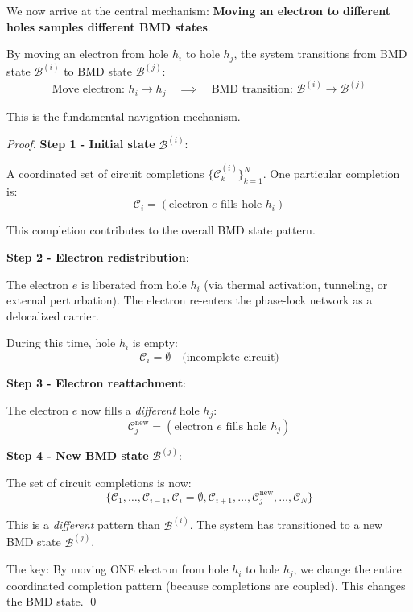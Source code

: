 We now arrive at the central mechanism: \textbf{Moving an electron to different holes samples different BMD states}.

\begin{theorem}
\label{thm:electron_navigation}
By moving an electron from hole $h_i$ to hole $h_j$, the system transitions from BMD state $\mathcal{B}^{(i)}$ to BMD state $\mathcal{B}^{(j)}$:
\begin{equation}
\text{Move electron: } h_i \to h_j \quad \implies \quad \text{BMD transition: } \mathcal{B}^{(i)} \to \mathcal{B}^{(j)}
\end{equation}

This is the fundamental navigation mechanism.
\end{theorem}

\begin{proof}
\textbf{Step 1 - Initial state} $\mathcal{B}^{(i)}$:

A coordinated set of circuit completions $\{\mathcal{C}_k^{(i)}\}_{k=1}^{N}$. One particular completion is:
\begin{equation}
\mathcal{C}_i = (\text{electron } e \text{ fills hole } h_i)
\end{equation}

This completion contributes to the overall BMD state pattern.

\textbf{Step 2 - Electron redistribution}:

The electron $e$ is liberated from hole $h_i$ (via thermal activation, tunneling, or external perturbation). The electron re-enters the phase-lock network as a delocalized carrier.

During this time, hole $h_i$ is empty:
\begin{equation}
\mathcal{C}_i = \emptyset \quad \text{(incomplete circuit)}
\end{equation}

\textbf{Step 3 - Electron reattachment}:

The electron $e$ now fills a \textit{different} hole $h_j$:
\begin{equation}
\mathcal{C}_j^{\text{new}} = (\text{electron } e \text{ fills hole } h_j)
\end{equation}

\textbf{Step 4 - New BMD state} $\mathcal{B}^{(j)}$:

The set of circuit completions is now:
\begin{equation}
\{\mathcal{C}_1, \ldots, \mathcal{C}_{i-1}, \mathcal{C}_i = \emptyset, \mathcal{C}_{i+1}, \ldots, \mathcal{C}_j^{\text{new}}, \ldots, \mathcal{C}_N\}
\end{equation}

This is a \textit{different} pattern than $\mathcal{B}^{(i)}$. The system has transitioned to a new BMD state $\mathcal{B}^{(j)}$.

The key: By moving ONE electron from hole $h_i$ to hole $h_j$, we change the entire coordinated completion pattern (because completions are coupled). This changes the BMD state. \qed
\end{proof}

